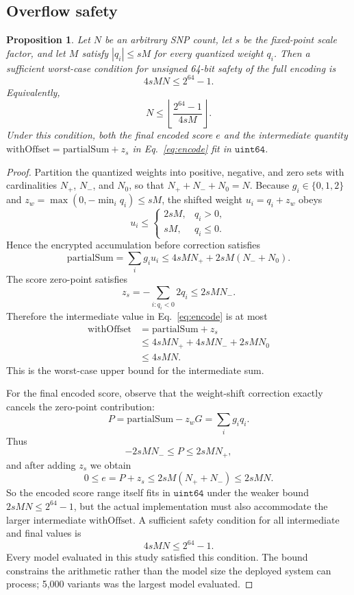 \documentclass[10pt]{article}
\newtheorem{proposition}{Proposition}
\begin{document}
\subsection{Overflow safety}
\label{sec:overflow}

\begin{proposition}
Let $N$ be an arbitrary SNP count, let $s$ be the fixed-point scale factor, and
let $M$ satisfy $|q_i| \leq sM$ for every quantized weight $q_i$.  Then a
sufficient worst-case condition for unsigned 64-bit safety of the full encoding
is
\[
4 s M N \leq 2^{64} - 1.
\]
Equivalently,
\[
N \leq \left\lfloor \frac{2^{64} - 1}{4 s M} \right\rfloor.
\]
Under this condition, both the final encoded score $e$ and the intermediate
quantity $\mathrm{withOffset} = \mathrm{partialSum} + z_s$ in
Eq.~\ref{eq:encode} fit in $\texttt{uint64}$.
\end{proposition}

{\renewcommand{\qedsymbol}{}
\begin{proof}
Partition the quantized weights into positive, negative, and zero sets with
cardinalities $N_{+}$, $N_{-}$, and $N_{0}$, so that $N_{+}+N_{-}+N_{0}=N$.
Because $g_i \in \{0,1,2\}$ and $z_w=\max(0,-\min_i q_i) \leq sM$, the shifted weight
$u_i = q_i + z_w$ obeys
\[
u_i \leq
\begin{cases}
2 s M, & q_i > 0,\\
s M, & q_i \leq 0.
\end{cases}
\]
Hence the encrypted accumulation before correction satisfies
\[
\mathrm{partialSum} = \sum_i g_i u_i
\leq 4 s M N_{+} + 2 s M (N_{-}+N_{0}).
\]
The score zero-point satisfies
\[
z_s = -\sum_{i:q_i<0} 2 q_i \leq 2 s M N_{-}.
\]
Therefore the intermediate value in Eq.~\ref{eq:encode} is at most
\begin{align*}
\mathrm{withOffset} &= \mathrm{partialSum} + z_s \\
&\leq 4sMN_{+}+4sMN_{-}+2sMN_{0} \\
&\leq 4sMN.
\end{align*}
This is the worst-case upper bound for the intermediate sum.

For the final encoded score, observe that the weight-shift correction exactly
cancels the zero-point contribution:
\[
P = \mathrm{partialSum} - z_w G = \sum_i g_i q_i.
\]
Thus
\[
-2 s M N_{-} \leq P \leq 2 s M N_{+},
\]
and after adding $z_s$ we obtain
\[
0 \leq e = P + z_s \leq 2 s M (N_{+}+N_{-}) \leq 2 s M N.
\]
So the encoded score range itself fits in $\texttt{uint64}$ under the weaker bound
$2 s M N \leq 2^{64}-1$, but the actual implementation must also accommodate the
larger intermediate $\mathrm{withOffset}$.  A sufficient safety condition for all
intermediate and final values is
\[
4 s M N \leq 2^{64}-1.
\]
Every model evaluated in this study satisfied this condition.  The bound constrains the
arithmetic rather than the model size the deployed system can process; 5,000 variants was
the largest model evaluated.
\end{proof}}
\end{document}
